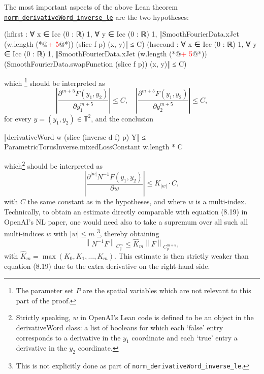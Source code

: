 \documentclass[10pt, a4paper, reqno]{amsart}
\numberwithin{equation}{section}
\renewcommand{\leq}{\leqslant}
\theoremstyle{definition}
\theoremstyle{definition}
\newcounter{constant}
\begin{document}
The most important aspects of the above Lean theorem \href{https://github.com/openai/NavierStokesAndEuler/blob/f9e8bc5b38b6e212696e8a30e3e91517af887bbd/NavierStokes/SmoothFamilyTorusInverse.lean#L1059-L1080}{\texttt{norm\_derivativeWord\_inverse\_le}} are the two hypotheses:  
\begin{lstlistinglean}
    (hfirst : ∀ x ∈ Icc (0 : ℝ) 1, ∀ y ∈ Icc (0 : ℝ) 1,
      ‖SmoothFourierData.xJet (w.length (*@\textcolor{red}{+ 5}@*)) (slice f p) (x, y)‖ ≤ C)
    (hsecond : ∀ x ∈ Icc (0 : ℝ) 1, ∀ y ∈ Icc (0 : ℝ) 1,
      ‖SmoothFourierData.xJet (w.length (*@\textcolor{red}{+ 5}@*))
        (SmoothFourierData.swapFunction (slice f p)) (x, y)‖ ≤ C) 
\end{lstlistinglean} 
\noindent which \footnote{The parameter set $P$ are the spatial variables which are not relevant to this part of the proof.} should be interpreted as
\begin{equation*}
	\left|\frac{\partial^{m+5} F(y_1,y_2)}{\partial y_{1}^{m+5}}\right| \leq C, \quad \left|\frac{\partial^{m+5} F(y_1,y_2)}{\partial y_{2}^{m+5}}\right| \leq C,
\end{equation*}
for every $y=(y_1,y_2) \in \mathbb{T}^2$, and the conclusion
\begin{lstlistinglean}
    ‖derivativeWord w (slice (inverse d f) p) Y‖ ≤
      ParametricTorusInverse.mixedLossConstant w.length * C
\end{lstlistinglean}
\noindent which\footnote{Strictly speaking, $w$ in OpenAI's Lean code is defined to be an object in the derivativeWord class: a list of booleans for which each `false' entry corresponds to a derivative in the $y_1$ coordinate and each `true' entry a derivative in the $y_2$ coordinate.} should be interpreted as 
\begin{equation*}
	\left|\frac{\partial^{|w|} N^{-1} F(y_1,y_2)}{\partial w}\right| \leq K_{|w|} \cdot C,
\end{equation*}
with $C$ the same constant as in the hypotheses, and where $w$ is a multi-index. Technically, to obtain an estimate directly comparable with equation (8.19) in OpenAI's NL paper, one would need also to take a supremum over all such all multi-indices $w$ with $|w| \leq m$ \footnote{This is not explicitly done as part of \texttt{norm\_derivativeWord\_inverse\_le}.}, thereby obtaining 
\begin{equation*}
	\left\|N^{-1} F\right\|_{C^m_y} \leq \hat K_m\left\|F\right\|_{C^{m+5}_y},
\end{equation*}
with $\hat K_m = \max(K_0,K_1,\dotsc,K_m)$. This estimate is then strictly weaker than equation (8.19) due to the extra derivative on the right-hand side.
\end{document}
